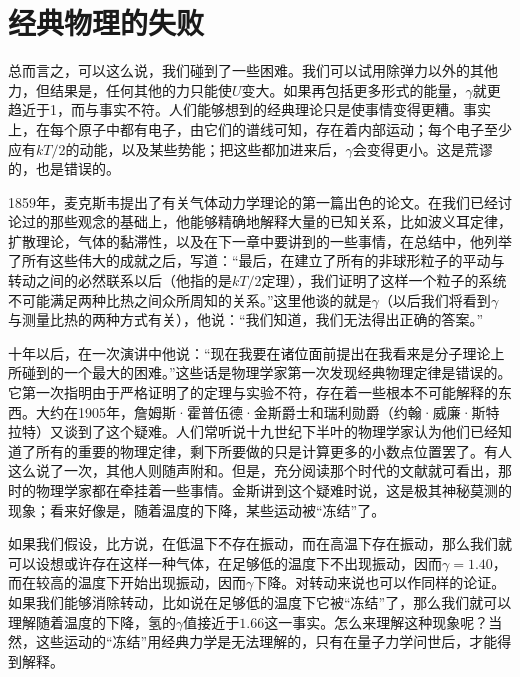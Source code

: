 \section{经典物理的失败}

总而言之，可以这么说，我们碰到了一些困难。我们可以试用除弹力以外的其他力，但结果是，任何其他的力只能使$U$变大。如果再包括更多形式的能量，$\gamma$就更趋近于1，而与事实不符。人们能够想到的经典理论只是使事情变得更糟。事实上，在每个原子中都有电子，由它们的谱线可知，存在着内部运动；每个电子至少应有$kT/2$的动能，以及某些势能；把这些都加进来后，$\gamma$会变得更小。这是荒谬的，也是错误的。

1859年，麦克斯韦提出了有关气体动力学理论的第一篇出色的论文。在我们已经讨论过的那些观念的基础上，他能够精确地解释大量的已知关系，比如波义耳定律，扩散理论，气体的黏滞性，以及在下一章中要讲到的一些事情，在总结中，他列举了所有这些伟大的成就之后，写道：“最后，在建立了所有的非球形粒子的平动与转动之间的必然联系以后（他指的是$kT/2$定理），我们证明了这样一个粒子的系统不可能满足两种比热之间众所周知的关系。”这里他谈的就是$\gamma$（以后我们将看到$\gamma$与测量比热的两种方式有关），他说：“我们知道，我们无法得出正确的答案。”

十年以后，在一次演讲中他说：“现在我要在诸位面前提出在我看来是分子理论上所碰到的一个最大的困难。”这些话是物理学家第一次发现经典物理定律是错误的。它第一次指明由于严格证明了的定理与实验不符，存在着一些根本不可能解释的东西。大约在1905年，詹姆斯·霍普伍德·金斯爵士和瑞利勋爵（约翰·威廉·斯特拉特）又谈到了这个疑难。人们常听说十九世纪下半叶的物理学家认为他们已经知道了所有的重要的物理定律，剩下所要做的只是计算更多的小数点位置罢了。有人这么说了一次，其他人则随声附和。但是，充分阅读那个时代的文献就可看出，那时的物理学家都在牵挂着一些事情。金斯讲到这个疑难时说，这是极其神秘莫测的现象；看来好像是，随着温度的下降，某些运动被“冻结”了。

如果我们假设，比方说，在低温下不存在振动，而在高温下存在振动，那么我们就可以设想或许存在这样一种气体，在足够低的温度下不出现振动，因而$\gamma=1.40$，而在较高的温度下开始出现振动，因而$\gamma$下降。对转动来说也可以作同样的论证。如果我们能够消除转动，比如说在足够低的温度下它被“冻结”了，那么我们就可以理解随着温度的下降，氢的$\gamma$值接近于$1.66$这一事实。怎么来理解这种现象呢？当然，这些运动的“冻结”用经典力学是无法理解的，只有在量子力学问世后，才能得到解释。

